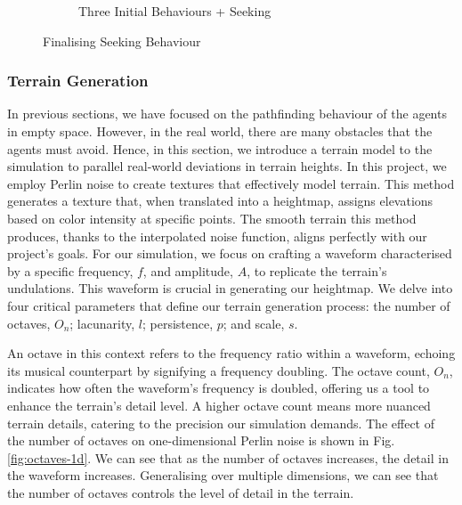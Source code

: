 \documentclass[12pt]{article}
\begin{document}
\begin{figure}[ht]
\begin{subfigure}{.45\textwidth}
\caption{Three Initial Behaviours + Seeking}
\label{fig:exp7}
\end{subfigure}
\caption{Finalising Seeking Behaviour}
\label{fig:exp67}
\end{figure}

\subsubsection{Terrain Generation}
In previous sections, we have focused on the pathfinding behaviour of the agents in empty space. However, in the real world, there are many obstacles that the agents must avoid. Hence, in this section, we introduce a terrain model to the simulation to parallel real-world deviations in terrain heights. In this project, we employ Perlin noise\cite[289-293]{Perlin} to create textures that effectively model terrain. This method generates a texture that, when translated into a heightmap, assigns elevations based on color intensity at specific points. The smooth terrain this method produces, thanks to the interpolated noise function, aligns perfectly with our project's goals. For our simulation, we focus on crafting a waveform characterised by a specific frequency, \(f\), and amplitude, \(A\), to replicate the terrain's undulations. This waveform is crucial in generating our heightmap. We delve into four critical parameters that define our terrain generation process: the number of octaves, \(O_n\); lacunarity, \(l\); persistence, \(p\); and scale, \(s\).

An octave in this context refers to the frequency ratio within a waveform, echoing its musical counterpart by signifying a frequency doubling. The octave count, \(O_n\), indicates how often the waveform's frequency is doubled, offering us a tool to enhance the terrain's detail level. A higher octave count means more nuanced terrain details, catering to the precision our simulation demands. The effect of the number of octaves on one-dimensional Perlin noise is shown in Fig. \ref{fig:octaves-1d}. We can see that as the number of octaves increases, the detail in the waveform increases. Generalising over multiple dimensions, we can see that the number of octaves controls the level of detail in the terrain.
\end{document}
